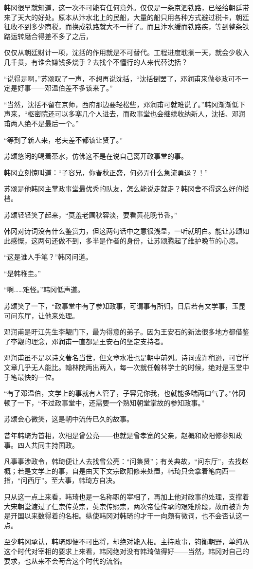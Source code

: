 韩冈很早就知道，这一次不可能有任何意外。仅仅是一条京泗铁路，已经给朝廷带来了天大的好处。原本从汴水北上的民船，大量的船只用各种方式避过税卡，朝廷征收不到多少商税，而换成铁路就大不一样了。而且汴水缓而铁路疾，等到整条铁路运转磨合得差不多了之后，

仅仅从朝廷财计一项，沈括的作用就是不可替代。工程进度耽搁一天，就会少收入几千贯，有谁会嫌钱多烧手？去找个不懂行的人来代替沈括？

“说得是啊，”苏颂叹了一声，不想再说沈括，“沈括倒罢了，邓润甫来做参政可不一定是好事——邓温伯差不多该来了。”

“当然，沈括不留在京师，西府那边要轻松些，邓润甫可就难说了。”韩冈渐渐低下声来，“枢密院还可以多塞几个人进去，而政事堂也会继续收纳新人，沈括、邓润甫两人绝不是最后一个。”

“等到了新人来，老夫差不都该让贤了。”

苏颂悠闲的喝着茶水，仿佛这不是在说自己离开政事堂的事。

韩冈立刻惊叫道：“子容兄，你春秋正盛，何必弄什么急流勇退？！”

苏颂是他韩冈主掌政事堂最优秀的队友，怎么能说走就走？韩冈舍不得这么好的搭档。

苏颂轻轻笑了起来，“莫羞老圃秋容淡，要看黄花晚节香。”

韩冈对诗词没有什么鉴赏力，但这两句话中之意很浅显，一听就明白。能让苏颂如此感慨，这两句还做不到，多半是作者的身份，让苏颂腾起了维护晚节的心思。

“这是谁人手笔？”韩冈问道。

“是韩稚圭。”

“啊……难怪。”韩冈低声道。

苏颂笑了一下，“政事堂中有了参知政事，可谓事有所归。日后若有文学事，玉昆可问东厅，让他来处理。

邓润甫是旴江先生李觏门下，最为得意的弟子。因为王安石的新法很多地方都借鉴了李觏的理念，邓润甫一直都是王安石的坚定支持者。

邓润甫虽不是以诗文著名当世，但文章水准也是朝中前列。诗词或许稍逊，可官样文章几乎无人能比。翰林院两出两入，每一次就任翰林学士的时候，绝对是玉堂中手笔最快的一位。

“有了邓温伯，文学上的事就有人管了，子容兄你我，也就能多喘两口气了。”韩冈顿了一下，“不过政事堂中，还需要一个熟知朝堂掌故的参知政事。”

苏颂会心微笑，这是朝中流传已久的故事。

昔年韩琦为首相，次相是曾公亮——也就是曾孝宽的父亲，赵概和欧阳修参知政事。四人共同主持国政。

凡事事涉政令，韩琦便让人去找曾公亮：“问集贤”；有关典故，“问东厅”，去找赵概；若是文学上的事，自是由天下文宗欧阳修来处置，韩琦只会拿着笔向西一指，“问西厅”。至大事，韩琦方自决。

只从这一点上来看，韩琦也是一名称职的宰相了，再加上他对政事的处理，支撑着大宋朝堂渡过了仁宗传英宗，英宗传熙宗，两次帝位传承的艰难阶段，故而被许为是开国以来数得着的名相。纵使韩冈对韩琦的才干一向颇有微词，也不会否认这一点。

至少韩冈承认，韩琦即便不可出将，却绝对能入相。主持政事，钧衡朝野，单纯从这个时代对宰相的要求上来看，韩冈绝对没有韩琦做得好——当然，韩冈对自己的要求，也从来不会苟合这个时代的流俗。
